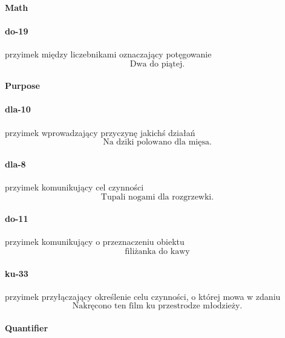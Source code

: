 \documentclass[a4paper, 12pt]{article}
\theoremstyle{remark}
\begin{document}
\paragraph{Math} %
\label{sub:mod_math}
\paragraph{do-19} \label{prep-19}	przyimek między liczebnikami oznaczający potęgowanie
\begin{equation}
\text{Dwa do piątej.}
\end{equation}

\paragraph{Purpose} %
\label{sub:purpose}
\paragraph{dla-10} \label{prep-10}	przyimek wprowadzający przyczynę jakichś działań
\begin{equation}
\text{Na dziki polowano dla mięsa.}
\end{equation}
\paragraph{dla-8} \label{prep-8}	przyimek komunikujący cel czynności
\begin{equation}
\text{Tupali nogami dla rozgrzewki.}
\end{equation}
\paragraph{do-11} \label{prep-11}	przyimek komunikujący o przeznaczeniu obiektu
\begin{equation}
\text{filiżanka do kawy}
\end{equation}
\paragraph{ku-33} \label{prep-33}	przyimek przyłączający określenie celu czynności, o której mowa w zdaniu
\begin{equation}
\text{Nakręcono ten film ku przestrodze młodzieży.}
\end{equation}

\paragraph{Quantifier} %
\label{sub:quantifier}
\end{document}
